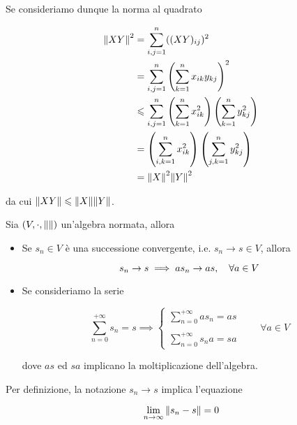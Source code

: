 Se consideriamo dunque la norma al quadrato

\begin{align}
	\begin{split}
		\norm{X Y}^{2} &= \sum_{i,j=1}^{n} ((X Y)_{ij})^{2}\\
		&= \sum_{i,j=1}^{n} \left( \sum_{k=1}^{n} x_{ik} y_{kj} \right)^{2}\\
		&\leqslant \sum_{i,j=1}^{n} \left( \sum_{k=1}^{n} x_{ik}^{2} \right) \left( \sum_{k=1}^{n} y_{kj}^{2} \right)\\
		&= \left( \sum_{i,k=1}^{n} x_{ik}^{2} \right) \left( \sum_{j,k=1}^{n} y_{kj}^{2} \right)\\
		&= \norm{X}^{2} \norm{Y}^{2}
	\end{split}
\end{align}

da cui $ \norm{X Y} \leqslant \norm{X} \norm{Y} $.

\begin{definition}
	Sia $ (V,\cdot,\norm{}) $ un'algebra normata, allora
	
	\begin{itemize}
		\item Se $ s_{n} \in V $ è una successione convergente, i.e. $ s_{n} \to s \in V $, allora
		
		\begin{equation}
			s_{n} \to s \implies a s_{n} \to a s \qcomma \forall a \in V
		\end{equation}
	
		\item Se consideriamo la serie
		
		\begin{equation}
			\sum_{n=0}^{+\infty} s_{n} = s %
			\implies %
			\begin{cases}
				\displaystyle \sum_{n=0}^{+\infty} a s_{n} = a s \\\\
				\displaystyle \sum_{n=0}^{+\infty} s_{n} a = s a
			\end{cases}
			\qquad \forall a \in V
		\end{equation}
	
		dove $ a s $ ed $ s a $ implicano la moltiplicazione dell'algebra.
	\end{itemize}
\end{definition}

Per definizione, la notazione $ s_{n} \to s $ implica l'equazione

\begin{equation}
	\lim_{n \to \infty} \norm{s_{n} - s} = 0
\end{equation}

